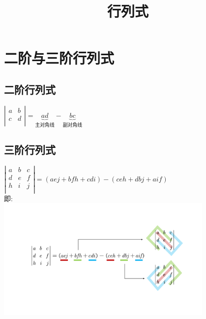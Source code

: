 \documentclass[UTF8]{ctexart}
\title{行列式}
\begin{document}
	\tableofcontents %
	\date{} %
	\maketitle  %
	
	
	
	
	\section{二阶与三阶行列式}
	
	\subsection{二阶行列式}
	
	$
	\left| \begin{matrix}
		a&		b\\
		c&		d\\
	\end{matrix} \right|=\underset{\text{主对角线}}{\underbrace{ad}}-\underset{\text{副对角线}}{\underbrace{bc}}
	$
	
	
	
		\subsection{三阶行列式}
	$
	\left| \begin{matrix}
		a&		b&		c\\
		d&		e&		f\\
		h&		i&		j\\
	\end{matrix} \right|=\left( aej+bfh+cdi \right) -\left( ceh+dbj+aif \right) 
	$ \\
	
	即: \\
	\includegraphics[width=0.8\textwidth]{img/0001.pdf}\\
	
\end{document}
